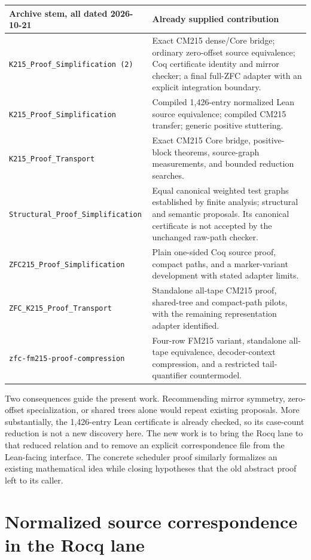 \documentclass[11pt]{article}
\theoremstyle{definition}\newtheorem{definition}[theorem]{Definition}
\begin{document}
\begingroup\small
\begin{longtable}{L{.34\textwidth}L{.57\textwidth}}
\toprule
Archive stem, all dated 2026-10-21 & Already supplied contribution\\
\midrule\endhead
\texttt{K215\_Proof\_Simplification (2)} & Exact CM215 dense/Core bridge;
ordinary zero-offset source equivalence; Coq certificate identity and mirror
checker; a final full-ZFC adapter with an explicit integration boundary.\\
\texttt{K215\_Proof\_Simplification} & Compiled 1,426-entry normalized Lean
source equivalence; compiled CM215 transfer; generic positive stuttering.\\
\texttt{K215\_Proof\_Transport} & Exact CM215 Core bridge, positive-block
theorems, source-graph measurements, and bounded reduction searches.\\
\texttt{Structural\_Proof\_\allowbreak Simplification} & Equal canonical weighted test
graphs established by finite analysis; structural and semantic proposals.
Its canonical certificate is not accepted by the unchanged raw-path checker.\\
\texttt{ZFC215\_Proof\_Simplification} & Plain one-sided Coq source proof,
compact paths, and a marker-variant development with stated adapter limits.\\
\texttt{ZFC\_K215\_Proof\_Transport} & Standalone all-tape CM215 proof,
shared-tree and compact-path pilots, with the remaining representation
adapter identified.\\
\texttt{zfc-fm215-proof-compression} & Four-row FM215 variant, standalone
all-tape equivalence, decoder-context compression, and a restricted
tail-quantifier countermodel.\\
\bottomrule
\end{longtable}
\endgroup

Two consequences guide the present work. Recommending mirror symmetry,
zero-offset specialization, or shared trees alone would repeat existing
proposals. More substantially, the 1,426-entry Lean certificate is already
checked, so its case-count reduction is not a new discovery here. The new
work is to bring the Rocq lane to that reduced relation and to remove an
explicit correspondence file from the Lean-facing interface. The concrete
scheduler proof similarly formalizes an existing mathematical idea while
closing hypotheses that the old abstract proof left to its caller.

\section{Normalized source correspondence in the Rocq lane}
\end{document}
